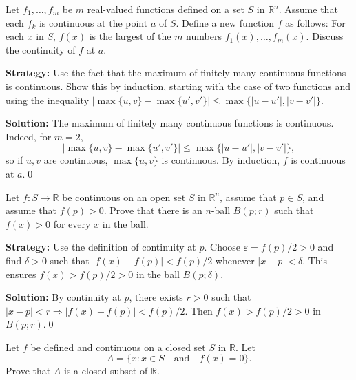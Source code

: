 \begin{problembox}
Let \( f_1, \ldots, f_m \) be \( m \) real-valued functions defined on a set \( S \) in \( \mathbb{R}^n \). Assume that each \( f_k \) is continuous at the point \( a \) of \( S \). Define a new function \( f \) as follows: For each \( x \) in \( S \), \( f(x) \) is the largest of the \( m \) numbers \( f_1(x), \ldots, f_m(x) \). Discuss the continuity of \( f \) at \( a \).
\end{problembox}

\noindent\textbf{Strategy:} Use the fact that the maximum of finitely many continuous functions is continuous. Show this by induction, starting with the case of two functions and using the inequality $|\max\{u,v\} - \max\{u',v'\}| \leq \max\{|u-u'|, |v-v'|\}$.

\bigskip\noindent\textbf{Solution:}
The maximum of finitely many continuous functions is continuous. Indeed, for $m=2$,
\[
|\max\{u,v\}-\max\{u',v'\}|\le \max\{|u-u'|,|v-v'|\},
\]
so if $u,v$ are continuous, $\max\{u,v\}$ is continuous. By induction, $f$ is continuous at $a$.\qed



\begin{problembox}
Let \( f: S \to \mathbb{R} \) be continuous on an open set \( S \) in \( \mathbb{R}^n \), assume that \( p \in S \), and assume that \( f(p) > 0 \). Prove that there is an \( n \)-ball \( B(p; r) \) such that \( f(x) > 0 \) for every \( x \) in the ball.
\end{problembox}

\noindent\textbf{Strategy:} Use the definition of continuity at $p$. Choose $\varepsilon = f(p)/2 > 0$ and find $\delta > 0$ such that $|f(x) - f(p)| < f(p)/2$ whenever $|x-p| < \delta$. This ensures $f(x) > f(p)/2 > 0$ in the ball $B(p;\delta)$.

\bigskip\noindent\textbf{Solution:}
By continuity at $p$, there exists $r>0$ such that $|x-p|<r\Rightarrow |f(x)-f(p)|<f(p)/2$. Then $f(x)>f(p)/2>0$ in $B(p;r)$.\qed



\begin{problembox}
Let \( f \) be defined and continuous on a closed set \( S \) in \( \mathbb{R} \). Let
\[A = \{x : x \in S \quad \text{and} \quad f(x) = 0\}.\]
Prove that \( A \) is a closed subset of \( \mathbb{R} \).
\end{problembox}

